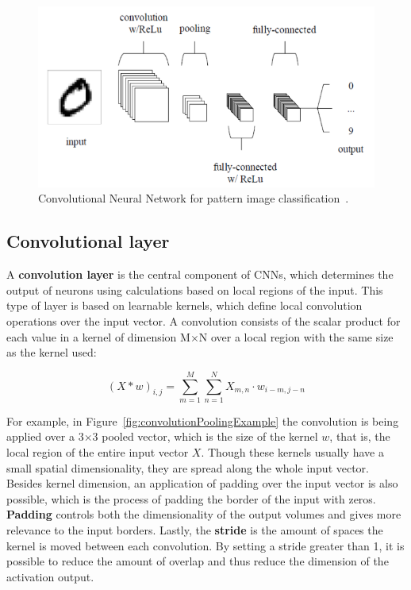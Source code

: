 \begin{figure}[!h]
    \centering
    \includegraphics[scale=.45]{imagenes/appendices/appendix_a/cnnModel.PNG}
    \caption{Convolutional Neural Network for pattern image classification~\cite{appendix:OSheaN15}.}
    \label{fig:convNet}
\end{figure}

\subsection{Convolutional layer}
\label{appendix:neuralNetworks/cnn/convLayer}
A \textbf{convolution layer} is the central component of CNNs, which determines the output of 
neurons using calculations based on local regions of the input. This type of layer is based on 
learnable kernels, which define local convolution operations over the input vector. A 
convolution consists of the scalar product for each value in a kernel of dimension M$\times$N 
over a local region with the same size as the kernel used:

\begin{equation} \label{eq:convolution}
    (X \ast w)_{i, j} = \sum_{m=1}^M \sum_{n=1}^{N} X_{m, n} \cdot w_{i-m, j-n}
\end{equation}

For example, in Figure~\ref{fig:convolutionPoolingExample} the convolution is being applied 
over a 3$\times$3 pooled vector, which is the size of the kernel $w$, that is, the local 
region of the entire input vector $X$. Though these kernels usually have a small spatial 
dimensionality, they are spread along the whole input vector. Besides kernel dimension, an 
application of padding over the input vector is also possible, which is the process of 
padding the border of the input with zeros. \textbf{Padding} controls both the dimensionality 
of the output volumes and gives more relevance to the input borders. Lastly, the 
\textbf{stride} is the amount of spaces the kernel is moved between each convolution. By 
setting a stride greater than 1, it is possible to reduce the amount of overlap and thus 
reduce the dimension of the activation output.

